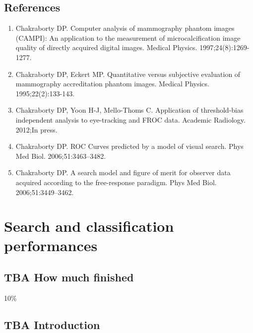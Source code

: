 \documentclass[
]{book}
\providecommand{\tightlist}{%
  \setlength{\itemsep}{0pt}\setlength{\parskip}{0pt}}
\begin{document}
\hypertarget{rsm-pred-references}{%
\section{References}\label{rsm-pred-references}}

\begin{enumerate}
\def\labelenumi{\arabic{enumi}.}
\tightlist
\item
  Chakraborty DP. Computer analysis of mammography phantom images (CAMPI): An application to the measurement of microcalcification image quality of directly acquired digital images. Medical Physics. 1997;24(8):1269-1277.
\item
  Chakraborty DP, Eckert MP. Quantitative versus subjective evaluation of mammography accreditation phantom images. Medical Physics. 1995;22(2):133-143.
\item
  Chakraborty DP, Yoon H-J, Mello-Thoms C. Application of threshold-bias independent analysis to eye-tracking and FROC data. Academic Radiology. 2012;In press.
\item
  Chakraborty DP. ROC Curves predicted by a model of visual search. Phys Med Biol. 2006;51:3463--3482.
\item
  Chakraborty DP. A search model and figure of merit for observer data acquired according to the free-response paradigm. Phys Med Biol. 2006;51:3449--3462.
\end{enumerate}

\hypertarget{rsm-sc}{%
\chapter{Search and classification performances}\label{rsm-sc}}

\hypertarget{rsm-sc-how-much-finished}{%
\section{TBA How much finished}\label{rsm-sc-how-much-finished}}

10\%

\hypertarget{rsm-sc-intro}{%
\section{TBA Introduction}\label{rsm-sc-intro}}
\end{document}
